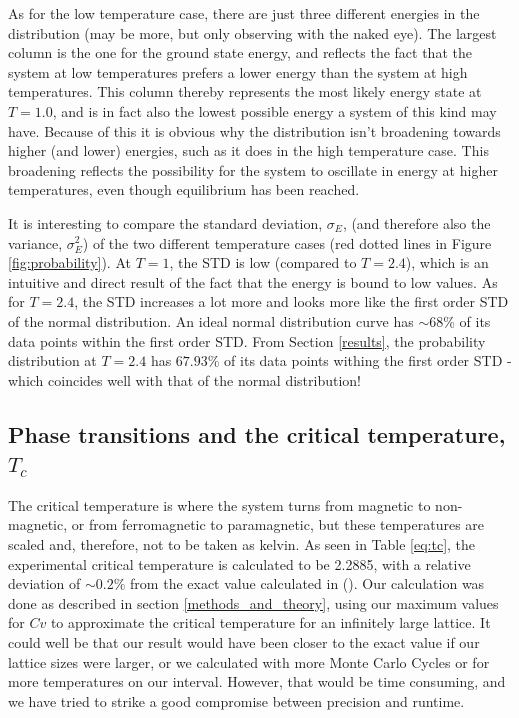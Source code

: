 \documentclass[12pt,english,a4paper]{article}
\begin{document}
As for the low temperature case, there are just three different energies in the distribution (may be more, but only observing with the naked eye). The largest column is the one for the ground state energy, and reflects the fact that the system at low temperatures prefers a lower energy than the system at high temperatures. This column thereby represents the most likely energy state at $T=1.0$, and is in fact also the lowest possible energy a system of this kind may have. Because of this it is obvious why the distribution isn't broadening towards higher (and lower) energies, such as it does in the high temperature case. This broadening reflects the possibility for the system to oscillate in energy at higher temperatures, even though equilibrium has been reached.

It is interesting to compare the standard deviation, $\sigma_E$, (and therefore also the variance, $\sigma_E^2$) of the two different temperature cases (red dotted lines in Figure \ref{fig:probability}). At $T=1$, the STD is low (compared to $T=2.4$), which is an intuitive and direct result of the fact that the energy is bound to low values. As for $T=2.4$, the STD increases a lot more and looks more like the first order STD of the normal distribution. An ideal normal distribution curve has $\sim 68\%$ of its data points within the first order STD. From Section \ref{results}, the probability distribution at $T=2.4$ has $67.93\%$ of its data points withing the first order STD - which coincides well with that of the normal distribution!

\subsection{Phase transitions and the critical temperature, $T_c$}

The critical temperature is where the system turns from magnetic to non-magnetic, or from ferromagnetic to paramagnetic, but these temperatures are scaled and, therefore, not to be taken as kelvin. As seen in Table \ref{eq:tc}, the experimental critical temperature is calculated to be 2.2885, with a relative deviation of $\sim 0.2\%$ from the exact value calculated in (\cite{LarsOns}). Our calculation was done as described in section \ref{methods_and_theory}, using our maximum values for $Cv$ to approximate the critical temperature for an infinitely large lattice. It could well be that our result would have been closer to the exact value if our lattice sizes were larger, or we calculated with more Monte Carlo Cycles or for more temperatures on our interval. However, that would be time consuming, and we have tried to strike a good compromise between precision and runtime. 
\end{document}
